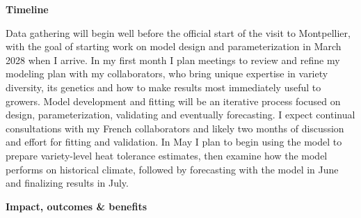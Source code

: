 \documentclass[11pt,letter,oneside]{article}
\begin{document}

{\bf Timeline}

 Data gathering will begin well before the official start of the visit to Montpellier, with the goal of starting work on model design and parameterization in March 2028 when I arrive. In my first month I plan meetings to review and refine my modeling plan with my collaborators, who bring unique expertise in variety diversity, its genetics and how to make results most immediately useful to growers. Model development and fitting will be an iterative process focused on design, parameterization, validating and eventually forecasting. I expect continual consultations with my French collaborators and likely two months of discussion and effort for fitting and validation. In May I plan to begin using the model to prepare variety-level heat tolerance estimates, then examine how the model performs on historical climate, followed by forecasting with the model in June and finalizing results in July. 

{\bf Impact, outcomes \& benefits}
\end{document}
